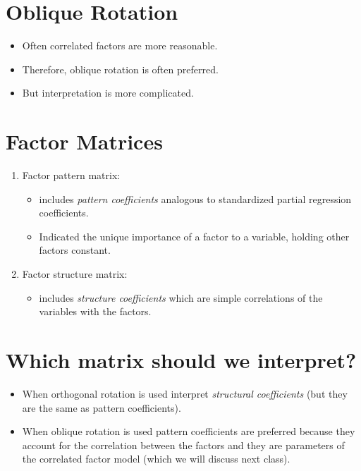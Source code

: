 \documentclass[
]{book}
\providecommand{\tightlist}{%
  \setlength{\itemsep}{0pt}\setlength{\parskip}{0pt}}
\begin{document}
\hypertarget{oblique-rotation}{%
\section{Oblique Rotation}\label{oblique-rotation}}

\begin{itemize}
\tightlist
\item
  Often correlated factors are more reasonable.
\item
  Therefore, oblique rotation is often preferred.
\item
  But interpretation is more complicated.
\end{itemize}

\hypertarget{factor-matrices}{%
\section{Factor Matrices}\label{factor-matrices}}

\begin{enumerate}
\def\labelenumi{\arabic{enumi}.}
\tightlist
\item
  Factor pattern matrix:

  \begin{itemize}
  \tightlist
  \item
    includes \emph{pattern coefficients} analogous to standardized partial regression coefficients.
  \item
    Indicated the unique importance of a factor to a variable, holding other factors constant.
  \end{itemize}
\item
  Factor structure matrix:

  \begin{itemize}
  \tightlist
  \item
    includes \emph{structure coefficients} which are simple correlations of the variables with the factors.
  \end{itemize}
\end{enumerate}

\hypertarget{which-matrix-should-we-interpret}{%
\section{Which matrix should we interpret?}\label{which-matrix-should-we-interpret}}

\begin{itemize}
\item
  When orthogonal rotation is used interpret \emph{structural coefficients} (but they are the same as pattern coefficients).
\item
  When oblique rotation is used pattern coefficients are preferred because they account for the correlation between the factors and they are parameters of the correlated factor model (which we will discuss next class).
\end{itemize}
\end{document}
